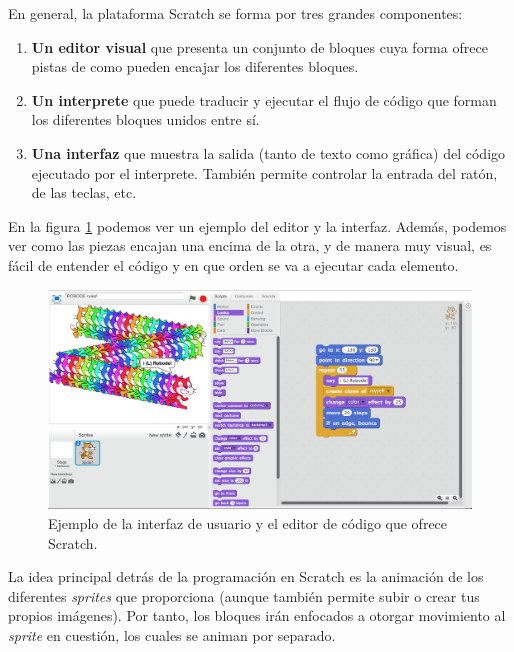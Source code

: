 En general, la plataforma Scratch se forma por tres grandes componentes:
\begin{enumerate}
	\item \textbf{Un editor visual} que presenta un conjunto de bloques cuya forma ofrece pistas de como pueden encajar los diferentes bloques.
	\item \textbf{Un interprete} que puede traducir y ejecutar el flujo de código que forman los diferentes bloques unidos entre sí.
	\item \textbf{Una interfaz} que muestra la salida (tanto de texto como gráfica) del código ejecutado por el interprete. También permite controlar la entrada del ratón, de las teclas, etc.
\end{enumerate}

En la figura \ref{fig:scratch-example} podemos ver un ejemplo del editor y la interfaz. Además, podemos ver como las piezas encajan una encima de la otra, y de manera muy visual, es fácil de entender el código y en que orden se va a ejecutar cada elemento.

\begin{figure}[!ht]
	\begin{centering}
		\includegraphics[width=1\textwidth]{images/scratch-example.png}
			\caption{Ejemplo de la interfaz de usuario y el editor de código que ofrece Scratch.}
				\label{fig:scratch-example}
	\end{centering}
\end{figure}

La idea principal detrás de la programación en Scratch es la animación de los diferentes \emph{sprites} que proporciona (aunque también permite subir o crear tus propios imágenes). Por tanto, los bloques irán enfocados a otorgar movimiento al \emph{sprite} en cuestión, los cuales se animan por separado.

